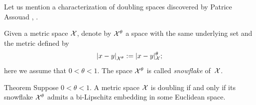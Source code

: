 Let us mention a characterization of doubling spaces discovered by Patrice Assouad \cite{assouad}, \cite[12.2]{heinonen}.

Given a metric space $\mathcal{X}$, 
denote by $\mathcal{X}^\theta$ a space with the same underlying set and the metric defined by 
\[\dist{x}{y}{\spc{X}^\theta}
\df
\dist[\theta]{x}{y}{\spc{X}};\]
here we assume that $0<\theta<1$.
The space $\mathcal{X}^\theta$ is called \emph{snowflake} of~$\mathcal{X}$.

\begin{thm}{Theorem}\label{thm:assuad}
Suppose $0<\theta<1$.
A metric space $\mathcal{X}$ is doubling if and only if its snowflake $\mathcal{X}^\theta$ admits a
bi-Lipschitz embedding in some Euclidean space.
\end{thm}


